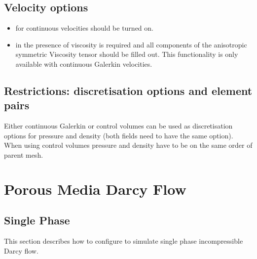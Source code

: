 \subsection{Velocity options}
\begin{itemize}
\item for continuous velocities  should be turned on.
\item in the presence of viscosity  is required and all components of the anisotropic symmetric Viscosity tensor should be filled out.  This functionality is only available with continuous Galerkin velocities.
\end{itemize}

\subsection{Restrictions: discretisation options and element pairs}
Either continuous Galerkin or control volumes can be used as discretisation options for pressure and density (both fields need to have the same option). When using control volumes pressure and density have to be on the same order of parent mesh.

\section{Porous Media Darcy Flow}
\label{sec:porous_media_darcy_flow_configure}

\subsection{Single Phase}

This section describes how to configure \fluidity to simulate single phase incompressible Darcy flow.

